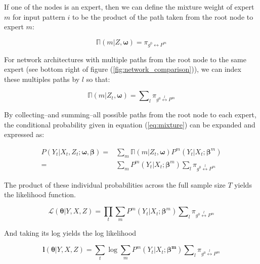 \documentclass[12pt]{article}
\newcommand{\gateprod}[2]{\pi_{#1 \longleftrightarrow #2}}
\newcommand{\sumgateprod}[3]{\pi_{#1 \overset{#3}{\longleftrightarrow} #2}}
\newcommand{\shortsum}[1]{\sum \nolimits_{#1}}
\newcommand{\expmixwt}[0]{\mathbb{\Pi}}
\begin{document}
If one of the nodes is an expert, then we can define the mixture weight
of expert $m$ for input pattern $i$ to be the product of the path taken
from the root node to expert $m$:

\begin{equation} \label{eq:gpath2}
  \expmixwt(m | Z, \boldsymbol{\omega}) = \gateprod{g^{0}}{P^{m}}
\end{equation}

For network architectures with multiple paths from the root node to
the same expert (see bottom right of figure (\ref{fig:network_comparison})),
we can index these multiples paths by $l$ so that:

\begin{equation} \label{eq:pathsums}
  \expmixwt(m | Z_{t}, \boldsymbol{\omega}) = \shortsum{l} \sumgateprod{g^{0}}{P^{m}}{l} 
\end{equation}


By collecting--and summing--all possible paths from the root node to each
expert, the conditional probability given in equation (\ref{eq:mixture}) can be
expanded and expressed as:

\begin{equation} \label{eq:contribution}
  \begin{split}
    P(Y_{t}|X_{t}, Z_{t}; \boldsymbol{\omega}, \boldsymbol{\beta}) =& \sum_{m} \expmixwt(m | Z_{t}, \boldsymbol{\omega}) P^{m}(Y_{t}|X_{t}; \boldsymbol{\beta}^{m}) \\ 
      =& \sum_{m} P^{m}(Y_{t}|X_{t}; \boldsymbol{\beta}^{m}) \shortsum{l} \sumgateprod{g^{0}}{P^{m}}{l}
  \end{split}
\end{equation}

The product of these individual probabilities across the full sample size $T$ yields
the likelihood function.

\begin{equation} \label{eq:likelihood}
  \mathcal{L}(\boldsymbol{\theta}| Y, X, Z) = \prod_{t}\sum_{m}P^{m}(Y_{t}|X_{t}; \boldsymbol{\beta}^{m}) \shortsum{l} \sumgateprod{g^{0}}{P^{m}}{l}
\end{equation}

And taking its log yields the log likelihood

\begin{equation} \label{eq:loglikelihood}
  \boldsymbol{l}(\boldsymbol{\theta}|Y, X, Z) = \sum_{t}\log\sum_{m}P^{m}(Y_{t}|X_{t}; \boldsymbol{\beta^{m}}) \shortsum{l} \sumgateprod{g^{0}}{P^{m}}{l}
\end{equation}
\end{document}
